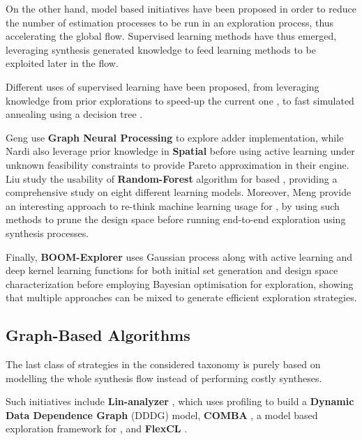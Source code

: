         On the other hand, model based initiatives have been proposed in order to reduce the number of estimation processes to be run in an exploration process, thus accelerating the global flow.
        Supervised learning methods have thus emerged, leveraging synthesis generated knowledge to feed learning methods to be exploited later in the flow.

        Different uses of supervised learning have been proposed, from leveraging knowledge from prior explorations to speed-up the current one \cite{ferretti_leveraging_2020}, to fast simulated annealing using a decision tree \cite{mahapatra_machine-learning_2014}.
        
        Geng \etal{} \cite{geng_high-speed_2021} use {\bf Graph Neural Processing} to explore adder implementation, while Nardi \etal{} \cite{nardi_practical_2019} also leverage prior knowledge in {\bf Spatial} before using active learning under unknown feasibility constraints to provide Pareto approximation in their  engine.
        Liu \etal{} \cite{liu_learning-based_2013} study the usability of {\bf Random-Forest} algorithm for  based , providing a comprehensive study on eight different learning models.
        Moreover, Meng \etal{} \cite{meng_adaptive_2016} provide an interesting approach to re-think machine learning usage for , by using such methods to prune the design space before running end-to-end exploration using synthesis processes.

        Finally, {\bf BOOM-Explorer} \cite{bai_boom-explorer_2021} uses Gaussian process along with active learning and deep kernel learning functions for both initial set generation and design space characterization before employing Bayesian optimisation for exploration, showing that multiple approaches can be mixed to generate efficient exploration strategies.

    \subsection{Graph-Based Algorithms}
    \label{ch.state:sec.strategies:ssec.graph}
        The last class of  strategies in the considered taxonomy is purely based on modelling the whole synthesis flow instead of performing costly syntheses.

        Such initiatives include {\bf Lin-analyzer} \cite{zhong_lin-analyzer_2016}, which uses profiling to build a {\bf Dynamic Data Dependence Graph} (DDDG) model, {\bf COMBA} \cite{zhao_comba_2017}\cite{zhao_performance_2020}, a model based exploration framework for , and {\bf FlexCL} \cite{wang_flexcl_2017}.
    
